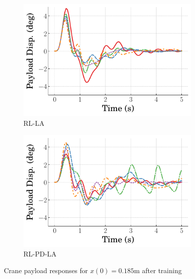 \begin{figure}[tb]
    \hfill
    \begin{subfigure}[b]{0.49\textwidth}
        \centering
        \includegraphics[width=\textwidth]{figures/figures_RL_model_based_control/time_responses_crane/dpcrane_RL_LA/Payload_displacement_0p185_init_300000_steps.pdf}
        \caption{RL-LA}
        \label{subfig_chap2:dpcrane_payload_resp_300000steps_RL_LA}
    \end{subfigure}
    \hfill
    \begin{subfigure}[b]{0.49\textwidth}
        \centering
        \includegraphics[width=\textwidth]{figures/figures_RL_model_based_control/time_responses_crane/dpcrane_RL_PD_LA/Payload_displacement_0p185_init_300000_steps.pdf}
        \caption{RL-PD-LA}
        \label{subfig_chap2:dpcrane_payload_resp_300000steps_RL_PD_LA}
    \end{subfigure}
    \hfill
    \caption{Crane payload responses for $x(0)=0.185\si{\meter}$ after training}
    \label{fig_chap2:dpcrane_payload_resp_300000steps}
\end{figure}
